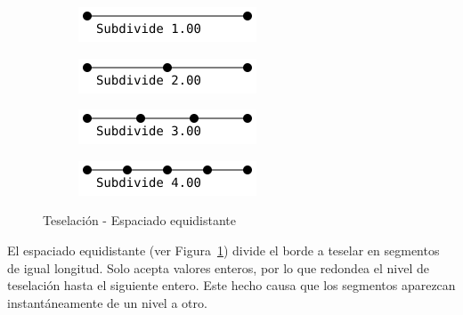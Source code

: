 \begin{figure}[h]
	\centering
	\begin{subfigure}{.45\textwidth}
			\includegraphics[width=\textwidth]{figures/equal1.png}	
	\end{subfigure}	
	\hfill
	\begin{subfigure}{.45\textwidth}
			\includegraphics[width=\textwidth]{figures/equal2.png}	
	\end{subfigure}	
	\newline
	\begin{subfigure}{.45\textwidth}
			\includegraphics[width=\textwidth]{figures/equal3.png}	
	\end{subfigure}	
	\hfill
	\begin{subfigure}{.45\textwidth}
			\includegraphics[width=\textwidth]{figures/equal4.png}	
	\end{subfigure}	
	\caption{Teselación - Espaciado equidistante}
	\label{fig3.2}
\end{figure}

El espaciado equidistante (ver Figura~\ref{fig3.2}) divide el borde a teselar
en segmentos de igual longitud. Solo acepta valores enteros, por lo que redondea
el nivel de teselación hasta el siguiente entero. Este hecho causa que los
segmentos aparezcan instantáneamente de un nivel a otro.\\

